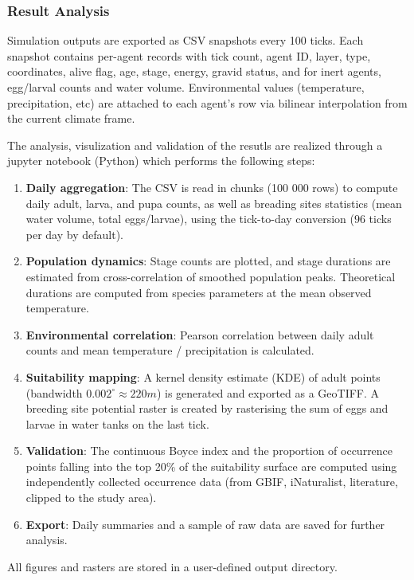\documentclass{article}
\begin{document}
\subsubsection{Result Analysis}
\label{sec:analysis}
\par
Simulation outputs are exported as CSV snapshots every 100 ticks. Each snapshot contains per-agent records 
with tick count, agent ID, layer, type, coordinates, alive flag, age, stage, energy, gravid status, and for inert agents, egg/larval 
counts and water volume. Environmental values (temperature, precipitation, etc) are attached to each agent's row via bilinear interpolation 
from the current climate frame.
\par
The analysis, visulization and validation of the resutls are realized through a jupyter notebook (Python) which performs the following steps:
\par
\begin{enumerate}
  \item \textbf{Daily aggregation}: The CSV is read in chunks (100 000 rows) to compute daily adult, larva, and pupa counts, as well 
  as breading sites statistics (mean water volume, total eggs/larvae), using the tick-to-day conversion ($96$ ticks per day by default).  
  \item \textbf{Population dynamics}: Stage counts are plotted, and stage durations are estimated from cross-correlation of smoothed 
  population peaks. Theoretical durations are computed from species parameters at the mean observed temperature.  
  \item \textbf{Environmental correlation}: Pearson correlation between daily adult counts and mean temperature / precipitation is calculated.  
  \item \textbf{Suitability mapping}: A kernel density estimate (KDE) of adult points (bandwidth $0.002^{\circ} \approx 220 m$) is generated and exported 
  as a GeoTIFF. A breeding site potential raster is created by rasterising the sum of eggs and larvae in water tanks on the last tick.  
  \item \textbf{Validation}: The continuous Boyce index \citep{2006.HA.ETA} and the proportion of occurrence points falling into the top 20\% 
  of the suitability surface are computed using independently collected occurrence data (from GBIF, iNaturalist, literature, clipped to 
  the study area).  
  \item \textbf{Export}: Daily summaries and a sample of raw data are saved for further analysis.
\end{enumerate}
\par
All figures and rasters are stored in a user-defined output directory.
\end{document}
